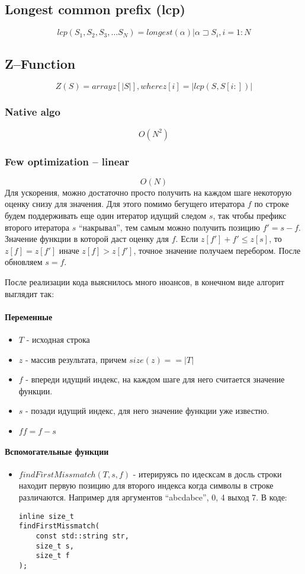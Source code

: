 \documentclass{article}
\begin{document}
\subsection{Longest common prefix (lcp)}
$$
    lcp(S_1, S_2, S_3, \ldots S_N) = longest(\alpha) | \alpha \sqsupset S_i, i = 1:N $$

\subsection{Z--Function}
$$
    Z(S) = array z[|S|], where z[i] = |lcp(S, S[i:])|
$$

\subsubsection{Native algo}
$$
    O(N^2)
$$

\subsubsection{Few optimization -- linear}
$$
    O(N)
$$
Для ускорения, можно достаточно просто получить на каждом шаге некоторую оценку
снизу для значения. Для этого помимо бегущего итератора $f$ по строке будем
поддерживать еще один итератор идущий следом $s$, так чтобы префикс второго
итератора $s$ ``накрывал'', тем самым можно получить позицию $f' = s - f$.
Значение функции в которой даст оценку для $f$. Если $z[f'] + f' \leq z[s]$, то
$z[f] = z[f']$ иначе $z[f] > z[f']$, точное значение получаем перебором. После
обновляем $s = f$.

После реализации кода выяснилось много нюансов, в конечном виде алгорит выглядит
так:
\paragraph{Переменные}
\begin{itemize}
    \item $T$ - исходная строка
    \item $z$ - массив результата, причем $size(z) == |T|$
    \item $f$ - впереди идущий индекс, на каждом шаге для него считается
значение функции.
    \item $s$ - позади идущий индекс, для него значение функции уже известно.
    \item $ff = f - s$
\end{itemize}

\paragraph{Вспомогательные функции}
\begin{itemize}
    \item $findFirstMissmatch(T, s, f)$ - итерируясь по идесксам в досль строки
находит первую позицию для второго индекса когда символы в строке различаются.
Например для аргументов ``abcdabce'', 0, 4 выход 7.
    В коде:
    \begin{lstlisting}
inline size_t
findFirstMissmatch(
    const std::string str,
    size_t s,
    size_t f
);
    \end{lstlisting}
\end{itemize}
\end{document}
